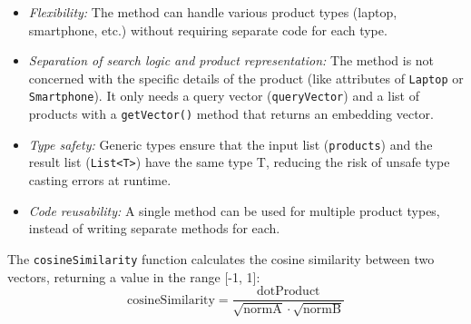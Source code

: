 \documentclass{article}
\begin{document}
\begin{itemize}
    \item \textit{Flexibility:} The method can handle various product types (laptop, smartphone, etc.) without requiring separate code for each type.
    \item \textit{Separation of search logic and product representation:} The method is not concerned with the specific details of the product (like attributes of \texttt{Laptop} or \texttt{Smartphone}). It only needs a query vector (\texttt{queryVector}) and a list of products with a \texttt{getVector()} method that returns an embedding vector.
    \item \textit{Type safety:} Generic types ensure that the input list (\texttt{products}) and the result list (\texttt{List<T>}) have the same type T, reducing the risk of unsafe type casting errors at runtime.
    \item \textit{Code reusability:} A single method can be used for multiple product types, instead of writing separate methods for each.
\end{itemize}
The \texttt{cosineSimilarity} function calculates the cosine similarity between two vectors, returning a value in the range [-1, 1]:
\[ \text{cosineSimilarity} = \frac{\text{dotProduct}}{\sqrt{\text{normA}} \cdot \sqrt{\text{normB}}} \]
\end{document}
